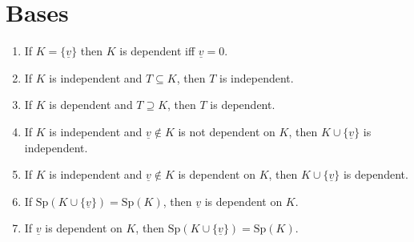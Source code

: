 \chapter{Bases}
\begin{lemma}\label{lem:truths}
    \begin{enumerate}
        \item If $K=\{\underline{v}\}$ then $K$ is dependent iff $\underline{v}=0$.
        \item If $K$ is independent and $T \subseteq K$, then $T$ is independent.
        \item If $K$ is dependent and $T \supseteq K$, then $T$ is dependent.
        \item If $K$ is independent and $\underline{v} \notin K$ is not dependent on $K$, then $K \cup \{\underline{v}\}$ is independent.
        \item If $K$ is independent and $\underline{v} \notin K$ is dependent on $K$, then $K \cup \{\underline{v}\}$ is dependent.
        \item If $\mathrm{Sp}(K \cup \{\underline{v}\}) = \mathrm{Sp}(K)$, then $\underline{v}$ is dependent on $K$.
        \item If $\underline{v}$ is dependent on $K$, then $\mathrm{Sp}(K \cup \{\underline{v}\}) = \mathrm{Sp}(K)$.
    \end{enumerate}

\end{lemma}